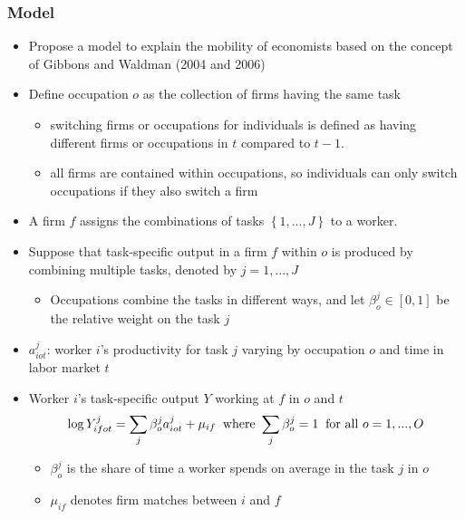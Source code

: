 \documentclass[11pt]{beamer}
\begin{document}
\begin{frame}
	\frametitle{Model}
	\begin{itemize}
		\item Propose a model to explain the mobility of economists based on the concept of Gibbons and Waldman (2004 and 2006)
		\item Define occupation $o$ as the collection of firms having the same task
		\begin{itemize}
			\item switching firms or occupations for individuals is defined as having different firms or occupations in $t$ compared to  $ t- 1$.
			\item all firms are contained within occupations, so individuals can only switch occupations if they also switch a firm
		\end{itemize}
		\item A firm $f$ assigns the combinations of tasks $\left\lbrace 1,...,J\right\rbrace $ to a worker.
		
		\item Suppose that task-specific output in a firm $f$ within $o$ is produced by combining multiple tasks, denoted by $j=1,...,J$
		\begin{itemize}
			\item Occupations combine the tasks in different ways, and let $\beta_o^j \in [0,1]$ be the relative weight on the  task $j$
		\end{itemize}
		\item $a_{iot}^j$: worker $i$'s productivity for task $j$ varying by occupation $o$ and time in labor market $t$
		
		\item Worker $i$'s task-specific output $Y$ working at $f$ in $o$ and $t$ 
		\begin{equation}
			\log{Y_{ifot}^j} = \sum_{j} \beta_{o}^{j} a_{iot}^j + \mu_{if} \;\;\text{where } \sum_{j} \beta_{o}^j = 1 \;\;\text{for all }o=1,...,O\notag
		\end{equation}
		\begin{itemize}
			\item $\beta_{o}^{j} $ is the share of time a worker spends on average in the task $j$ in  $o$
			\item $\mu_{if}$ denotes firm matches between $i$ and $f$ 
		\end{itemize}
	\end{itemize}
\end{frame}
\end{document}

